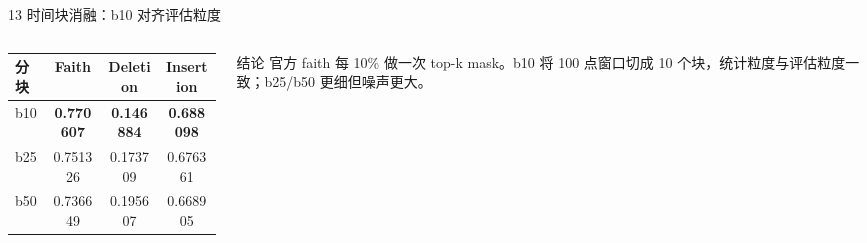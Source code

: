 \documentclass[aspectratio=169]{beamer}
\begin{document}
\begin{frame}{13 时间块消融：b10 对齐评估粒度}
    \small
    \begin{columns}[T,onlytextwidth]
        \begin{column}{0.52\textwidth}
            \begin{table}
                \centering
                \scriptsize
                \begin{tabular}{lccc}
                    \toprule
                    分块 & Faith & Deletion & Insertion \\
                    \midrule
                    b10 & \textbf{0.770607} & \textbf{0.146884} & \textbf{0.688098} \\
                    b25 & 0.751326 & 0.173709 & 0.676361 \\
                    b50 & 0.736649 & 0.195607 & 0.668905 \\
                    \bottomrule
                \end{tabular}
            \end{table}
        \end{column}
        \begin{column}{0.44\textwidth}
            \begin{block}{结论}
                官方 faith 每 10\% 做一次 top-k mask。b10 将 100 点窗口切成 10 个块，统计粒度与评估粒度一致；b25/b50 更细但噪声更大。
            \end{block}
        \end{column}
    \end{columns}
    \vspace{0.1cm}
    \begin{center}
    \end{center}
\end{frame}
\end{document}
